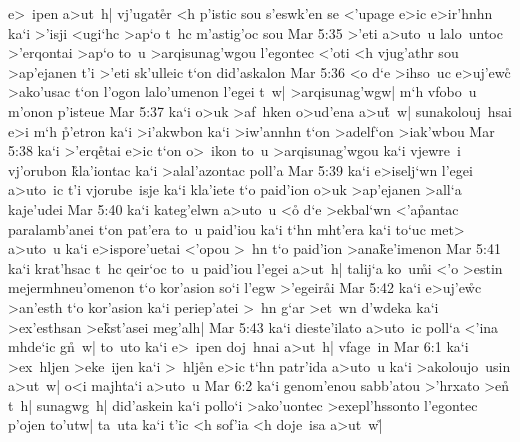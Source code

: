 e>~ipen
a>ut~h|
vj'ugat\r{e}r
<h
p'istic
sou
s'eswk'en
se
<'upage
e>ic
e>ir'hnhn
ka`i
>'isji
<ugi`hc
>ap`o
t~hc
m'astig'oc
sou\bibvsend
\vs Mar 5:35
>'eti
a>uto~u
lalo~untoc
>'erqontai
>ap`o
to~u
>arqisunag'wgou
l'egontec
<'oti
<h
vjug'athr
sou
>ap'ejanen
t'i
>'eti
sk'ulleic
t`on
did'askalon\bibvsend
\vs Mar 5:36
<o
d`e
>ihso~uc
e>uj'ewc\r{}
>ako'usac
t`on
l'ogon
lalo'umenon
l'egei
t~w|
>arqisunag'wgw|
m`h
vfobo~u
m'onon
p'isteue\bibvsend
\vs Mar 5:37
ka`i
o>uk
>af~hken
o>ud'ena
a>u\r{t}~w|
sunakolouj~hsai
e>i
m`h
\r{p}'etron
ka`i
>i'akwbon
ka`i
>iw'annhn
t`on
>adelf`on
>iak'wbou\bibvsend
\vs Mar 5:38
ka`i
>'erq\r{e}tai
e>ic
t`on
o>~ikon
to~u
>arqisunag'wgou
ka`i
vjewre~i
vj'orubon
\r{k}la'iontac
ka`i
>alal'azontac
poll'a\bibvsend
\vs Mar 5:39
ka`i
e>iselj`wn
l'egei
a>uto~ic
t'i
vjorube~isje
ka`i
kla'iete
t`o
paid'ion
o>uk
>ap'ejanen
>all`a
kaje'udei\bibvsend
\vs Mar 5:40
ka`i
kateg'elwn
a>uto~u
<o\r{}
d`e
>ekbal`wn
<'a\r{p}antac
paralamb'anei
t`on
pat'era
to~u
paid'iou
ka`i
t`hn
mht'era
ka`i
to`uc
met>
a>uto~u
ka`i
e>ispore'uetai
<'opou
>~hn
t`o
paid'ion
>ana\r{k}e'imenon\bibvsend
{}
\vs Mar 5:41
ka`i
krat'hsac
t~hc
qeir`oc
to~u
paid'iou
l'egei
a>ut~h|
talij`a
ko~u\r{m}i
<'o
>estin
mejermhneu'omenon
t`o
kor'asion
so`i
l'egw
>'egeir\r{a}i\bibvsend
{}
\vs Mar 5:42
ka`i
e>uj'e\r{w}c
>an'esth
t`o
kor'asion
ka`i
periep'atei
>~hn
g`ar
>et~wn
d'wdeka
ka`i
>ex'esthsan
>e\r{k}st'asei
meg'alh|\bibvsend
\vs Mar 5:43
ka`i
dieste'ilato
a>uto~ic
poll`a
<'ina
mhde`ic
g\r{n}~w|
to~uto
ka`i
e>~ipen
doj~hnai
a>ut~h|
vfage~in\bibvsend
\vs Mar 6:1
ka`i
>ex~hljen
>eke~ijen
ka`i
>~hlj\r{e}n
e>ic
t`hn
patr'ida
a>uto~u
ka`i
>akoloujo~usin
a>ut~w|
o<i
majhta`i
a>uto~u\bibvsend
\vs Mar 6:2
ka`i
genom'enou
sabb'atou
>'hrxato
>en\r{}
t~h|
sunagwg~h|
did'askein
ka`i
pollo`i
>ako'uontec
>exepl'hssonto
l'egontec
p'ojen
to'utw|
ta~uta
ka`i
t'ic
<h
sof'ia
<h
doje~isa
a>ut~w|\r{}
